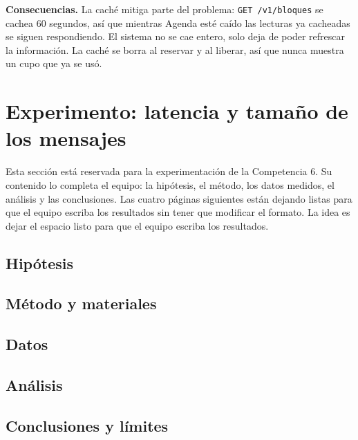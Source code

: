 \documentclass[12pt, a4paper]{article}
\begin{document}
\textbf{Consecuencias.} La caché mitiga parte del problema: \texttt{GET
/v1/bloques} se cachea 60 segundos, así que mientras Agenda esté caído las
lecturas ya cacheadas se siguen respondiendo. El sistema no se cae entero,
solo deja de poder refrescar la información. La caché se borra al reservar
y al liberar, así que nunca muestra un cupo que ya se usó.


\newpage
\section{Experimento: latencia y tamaño de los mensajes}\label{sec:experimento}

\begin{aviso}
Esta sección está reservada para la experimentación de la Competencia 6.
Su contenido lo completa el equipo: la hipótesis, el método, los datos
medidos, el análisis y las conclusiones. Las cuatro páginas siguientes
están dejando listas para que el equipo escriba los resultados sin tener
que modificar el formato. La idea es dejar el espacio listo para
que el equipo escriba los resultados.
\end{aviso}

\subsection{Hipótesis}

\subsection{Método y materiales}

\subsection{Datos}

\newpage
\subsection{Análisis}

\subsection{Conclusiones y límites}

\end{document}
